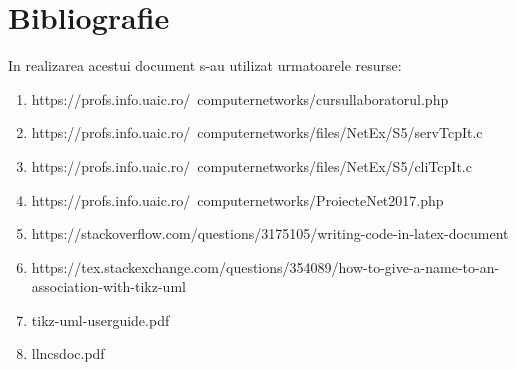\documentclass{llncs}
\begin{document}
\section{Bibliografie}
%
In realizarea acestui document s-au utilizat urmatoarele resurse:
%
\begin{enumerate}
\item https://profs.info.uaic.ro/~computernetworks/cursullaboratorul.php
\item https://profs.info.uaic.ro/~computernetworks/files/NetEx/S5/servTcpIt.c
\item https://profs.info.uaic.ro/~computernetworks/files/NetEx/S5/cliTcpIt.c
\item https://profs.info.uaic.ro/~computernetworks/ProiecteNet2017.php
\item https://stackoverflow.com/questions/3175105/writing-code-in-latex-document
\item https://tex.stackexchange.com/questions/354089/how-to-give-a-name-to-an-association-with-tikz-uml
\item tikz-uml-userguide.pdf
\item llncsdoc.pdf
\end{enumerate}
\end{document}

